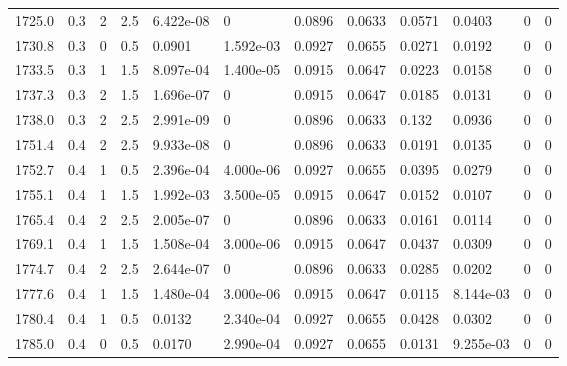\documentclass[preview]{standalone}
\begin{document}
{{{{{{{{{{\begin{tabular}{L{1.2cm}C{1.2cm} C{0.3cm}C{0.5cm} C{1.4cm}C{1.4cm} C{1.4cm}C{1.4cm} C{1.6cm}C{1.6cm} C{1.6cm}C{1.6cm}}
  1725.0  &   0.3  & 2     & 2.5 &  6.422e-08  & 0  &  0.0896&   0.0633& 0.0571 & 0.0403   &  0 & 0  \\ 
  1730.8  &   0.3  & 0     & 0.5 &  0.0901  & 1.592e-03  &  0.0927&   0.0655& 0.0271 & 0.0192   &  0 & 0  \\ 
  1733.5  &   0.3  & 1     & 1.5 &  8.097e-04  & 1.400e-05  &  0.0915&   0.0647& 0.0223 & 0.0158   &  0 & 0  \\ 
  1737.3  &   0.3  & 2     & 1.5 &  1.696e-07  & 0  &  0.0915&   0.0647& 0.0185 & 0.0131   &  0 & 0  \\ 
  1738.0  &   0.3  & 2     & 2.5 &  2.991e-09  & 0  &  0.0896&   0.0633& 0.132 & 0.0936   &  0 & 0  \\ 
  1751.4  &   0.4  & 2     & 2.5 &  9.933e-08  & 0  &  0.0896&   0.0633& 0.0191 & 0.0135   &  0 & 0  \\ 
  1752.7  &   0.4  & 1     & 0.5 &  2.396e-04  & 4.000e-06  &  0.0927&   0.0655& 0.0395 & 0.0279   &  0 & 0  \\ 
  1755.1  &   0.4  & 1     & 1.5 &  1.992e-03  & 3.500e-05  &  0.0915&   0.0647& 0.0152 & 0.0107   &  0 & 0  \\ 
  1765.4  &   0.4  & 2     & 2.5 &  2.005e-07  & 0  &  0.0896&   0.0633& 0.0161 & 0.0114   &  0 & 0  \\ 
  1769.1  &   0.4  & 1     & 1.5 &  1.508e-04  & 3.000e-06  &  0.0915&   0.0647& 0.0437 & 0.0309   &  0 & 0  \\ 
  1774.7  &   0.4  & 2     & 2.5 &  2.644e-07  & 0  &  0.0896&   0.0633& 0.0285 & 0.0202   &  0 & 0  \\ 
  1777.6  &   0.4  & 1     & 1.5 &  1.480e-04  & 3.000e-06  &  0.0915&   0.0647& 0.0115 & 8.144e-03   &  0 & 0  \\ 
  1780.4  &   0.4  & 1     & 0.5 &  0.0132  & 2.340e-04  &  0.0927&   0.0655& 0.0428 & 0.0302   &  0 & 0  \\ 
  1785.0  &   0.4  & 0     & 0.5 &  0.0170  & 2.990e-04  &  0.0927&   0.0655& 0.0131 & 9.255e-03   &  0 & 0  \\ 
\hline 
\end{tabular} 

}}}}}}}}}}
\end{document}
